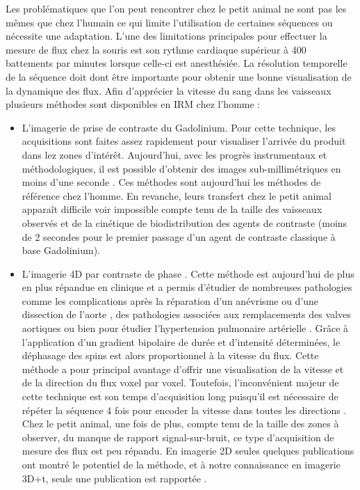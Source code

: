 Les problématiques que l'on peut rencontrer chez le petit animal ne sont pas les mêmes que chez l'humain ce qui limite l'utilisation de certaines séquences ou nécessite une adaptation. L'une des limitations principales pour effectuer la mesure de flux chez la souris est son rythme cardiaque supérieur à 400 battements par minutes lorsque celle-ci est anesthésiée. La résolution temporelle de la séquence doit dont être importante pour obtenir une bonne visualisation de la dynamique des flux. Afin d’apprécier la vitesse du sang dans les vaisseaux plusieurs méthodes sont disponibles en IRM chez l’homme : 
\begin{itemize}
\item L’imagerie de prise de contraste du Gadolinium. Pour cette technique, les acquisitions sont faites assez rapidement pour visualiser l’arrivée du produit dans lez zones d’intérêt. Aujourd’hui, avec les progrès instrumentaux et méthodologiques, il est possible d’obtenir des images sub-millimétriques en moins d’une seconde \cite{Wu:2011ys}. Ces méthodes sont aujourd’hui les méthodes de référence chez l’homme. En revanche, leurs transfert chez le petit animal apparaît difficile voir impossible compte tenu de la taille des vaisseaux observés et de la cinétique de biodistribution des agents de contraste (moins de 2 secondes pour le premier passage d’un agent de contraste classique à base Gadolinium).

\item L’imagerie 4D par contraste de phase \cite{Markl:2012pi}. Cette méthode est aujourd’hui de plus en plus répandue en clinique et a permis d’étudier de nombreuses pathologies comme les complications après la réparation d'un anévrisme ou d'une dissection de l'aorte \cite{frydrychowicz2011aortic} , des pathologies associées aux remplacements des valves aortiques \cite{kvitting2004flow} ou bien pour étudier l'hypertension pulmonaire artérielle \cite{sanz2007pulmonary}.
Grâce à l’application d’un gradient bipolaire de durée et d’intensité déterminées, le déphasage des spins est alors proportionnel à la vitesse du flux. Cette méthode a pour principal avantage d’offrir une visualisation de la vitesse et de la direction du flux voxel par voxel. Toutefois, l’inconvénient majeur de cette technique est son temps d’acquisition long puisqu’il est nécessaire de répéter la séquence 4 fois pour encoder la vitesse dans toutes les directions \cite{Johnson:2010uq,Robson:2010uq,Wu:2013ys}. 
Chez le petit animal, une fois de plus, compte tenu de la taille des zones à observer, du manque de rapport signal-sur-bruit, ce type d’acquisition de mesure des flux est peu répandu. En imagerie 2D seules quelques publications ont montré le potentiel de la méthode, et à notre connaissance en imagerie 3D+t, seule une publication est rapportée \cite{Janiczek:2011qm}.


\end{itemize}

